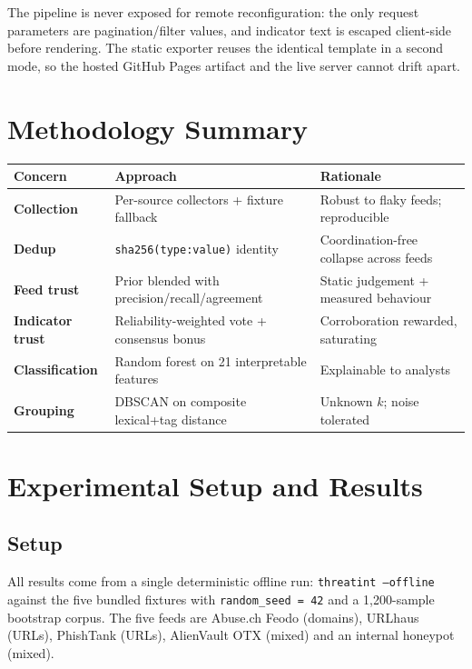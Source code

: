 \documentclass[11pt,a4paper]{article}
\newcommand{\code}[1]{\texttt{\small #1}}
\begin{document}
The pipeline is never exposed for remote reconfiguration: the only request
parameters are pagination/filter values, and indicator text is escaped
client-side before rendering. The static exporter reuses the identical template
in a second mode, so the hosted GitHub Pages artifact and the live server cannot
drift apart.

\section{Methodology Summary}

\begin{center}
\begin{tabularx}{\linewidth}{@{}>{\bfseries}p{3.1cm}p{3.4cm}X@{}}
\toprule
\rowcolor{paper}\textbf{Concern} & \textbf{Approach} & \textbf{Rationale} \\
\midrule
Collection & Per-source collectors + fixture fallback & Robust to flaky feeds; reproducible \\
Dedup & \code{sha256(type:value)} identity & Coordination-free collapse across feeds \\
Feed trust & Prior blended with precision/recall/agreement & Static judgement + measured behaviour \\
Indicator trust & Reliability-weighted vote + consensus bonus & Corroboration rewarded, saturating \\
Classification & Random forest on 21 interpretable features & Explainable to analysts \\
Grouping & DBSCAN on composite lexical+tag distance & Unknown $k$; noise tolerated \\
\end{tabularx}
\end{center}

\section{Experimental Setup and Results}

\subsection{Setup}
All results come from a single deterministic offline run: \code{threatint
--offline} against the five bundled fixtures with \code{random\_seed = 42} and a
1{,}200-sample bootstrap corpus. The five feeds are Abuse.ch Feodo (domains),
URLhaus (URLs), PhishTank (URLs), AlienVault OTX (mixed) and an internal
honeypot (mixed).
\end{document}
